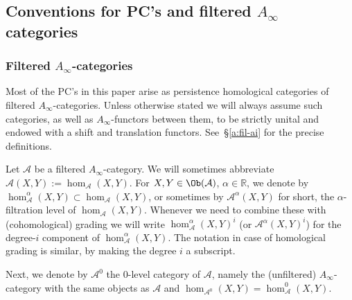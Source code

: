%

\subsection{Conventions for PC's and filtered $A_{\infty}$
  categories}\label{subsec:A_{infty}}

\subsubsection{Filtered $A_{\infty}$-categories} \label{sbsb:fai} Most
of the PC's in this paper arise as persistence homological categories
of filtered $A_{\infty}$-categories. Unless otherwise stated we will
always assume such categories, as well as $A_{\infty}$-functors
between them, to be strictly unital and endowed with a shift and
translation functors. See~\S\ref{a:fil-ai} for the precise
definitions.

Let $\mathcal{A}$ be a filtered $A_{\infty}$-category.  We will
sometimes abbreviate $\mathcal{A}(X,Y) :=
\hom_{\mathcal{A}}(X,Y)$. For $X, Y \in \Ob(\mathcal{A})$,
$\alpha \in \mathbb{R}$, we denote by
$\hom_{\mathcal{A}}^{\alpha}(X,Y) \subset \hom_{\mathcal{A}}(X,Y)$, or
sometimes by $\mathcal{A}^{\alpha}(X,Y)$ for short, the
$\alpha$-filtration level of $\hom_{\mathcal{A}}(X,Y)$. Whenever we
need to combine these with (cohomological) grading we will write
$\hom_{\mathcal{A}}^{\alpha}(X,Y)^i$ (or
$\mathcal{A}^{\alpha}(X,Y)^i$) for the degree-$i$ component of
$\hom_{\mathcal{A}}^{\alpha}(X,Y)$. The notation in case of
homological grading is similar, by making the degree $i$ a subscript.

Next, we denote by $\mathcal{A}^0$ the $0$-level category of
$\mathcal{A}$, namely the (unfiltered) $A_{\infty}$-category with the
same objects as $\mathcal{A}$ and
$\hom_{\mathcal{A}^0}(X,Y) = \hom_{\mathcal{A}}^0(X,Y)$.

